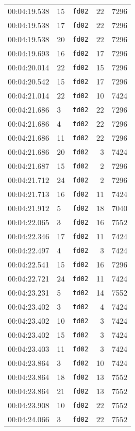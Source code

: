 \documentclass{article}
\begin{document}
\begin{longtable}{lllrr}
00:04:19.538 & 15 & \texttt{fd02} & 22 & 7296 \\
00:04:19.538 & 17 & \texttt{fd02} & 22 & 7296 \\
00:04:19.538 & 20 & \texttt{fd02} & 22 & 7296 \\
00:04:19.693 & 16 & \texttt{fd02} & 17 & 7296 \\
00:04:20.014 & 22 & \texttt{fd02} & 15 & 7296 \\
00:04:20.542 & 15 & \texttt{fd02} & 17 & 7296 \\
00:04:21.014 & 22 & \texttt{fd02} & 10 & 7424 \\
00:04:21.686 & 3 & \texttt{fd02} & 22 & 7296 \\
00:04:21.686 & 4 & \texttt{fd02} & 22 & 7296 \\
00:04:21.686 & 11 & \texttt{fd02} & 22 & 7296 \\
00:04:21.686 & 20 & \texttt{fd02} & 3 & 7424 \\
00:04:21.687 & 15 & \texttt{fd02} & 2 & 7296 \\
00:04:21.712 & 24 & \texttt{fd02} & 2 & 7296 \\
00:04:21.713 & 16 & \texttt{fd02} & 11 & 7424 \\
00:04:21.912 & 5 & \texttt{fd02} & 18 & 7040 \\
00:04:22.065 & 3 & \texttt{fd02} & 16 & 7552 \\
00:04:22.346 & 17 & \texttt{fd02} & 11 & 7424 \\
00:04:22.497 & 4 & \texttt{fd02} & 3 & 7424 \\
00:04:22.541 & 15 & \texttt{fd02} & 16 & 7296 \\
00:04:22.721 & 24 & \texttt{fd02} & 11 & 7424 \\
00:04:23.231 & 5 & \texttt{fd02} & 14 & 7552 \\
00:04:23.402 & 3 & \texttt{fd02} & 4 & 7424 \\
00:04:23.402 & 10 & \texttt{fd02} & 3 & 7424 \\
00:04:23.402 & 15 & \texttt{fd02} & 3 & 7424 \\
00:04:23.403 & 11 & \texttt{fd02} & 3 & 7424 \\
00:04:23.864 & 3 & \texttt{fd02} & 10 & 7424 \\
00:04:23.864 & 18 & \texttt{fd02} & 13 & 7552 \\
00:04:23.864 & 21 & \texttt{fd02} & 13 & 7552 \\
00:04:23.908 & 10 & \texttt{fd02} & 22 & 7552 \\
00:04:24.066 & 3 & \texttt{fd02} & 22 & 7552 \\

\end{longtable}
\end{document}
